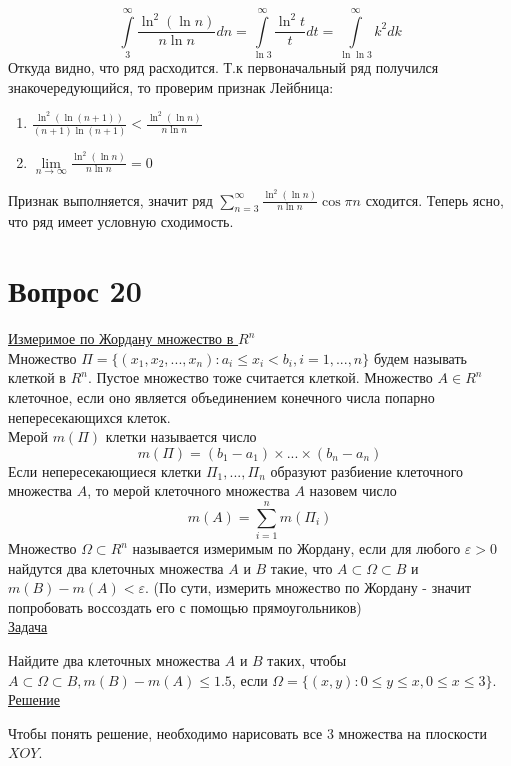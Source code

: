 \documentclass{report}
\begin{document}
$$\int\limits_3^\infty \frac{\ln^2{(\ln{n})}}{n \ln{n}} dn = \int\limits_{\ln{3}}^\infty \frac{\ln^2{t}}{t} dt = \int\limits_{\ln{\ln{3}}}^\infty k^2 dk$$
Откуда видно, что ряд расходится. Т.к первоначальный ряд получился знакочередующийся, то проверим признак Лейбница:
\begin{enumerate}
\item $\frac{\ln^2{(\ln{(n + 1)})}}{(n + 1) \ln{(n + 1)}} < \frac{\ln^2{(\ln{n})}}{n \ln{n}}$
\item $\lim\limits_{n \to \infty} \frac{\ln^2{(\ln{n})}}{n \ln{n}} = 0$
\end{enumerate}
Признак выполняется, значит ряд $\sum\limits_{n = 3}^\infty \frac{\ln^2{(\ln{n})}}{n \ln{n}} \cos{\pi n}$ сходится. Теперь ясно, что ряд имеет условную сходимость.

\newpage
\section{Вопрос 20}
\underline{Измеримое по Жордану множество в $R^{n}$}\\

Множество $\Pi = \{(x_{1}, x_{2}, ... , x_{n}): a_{i} \leq x_{i} < b_{i}, i = 1, ... , n\}$ будем называть клеткой в $R^{n}$. Пустое множество тоже считается клеткой. Множество $A\in R^{n}$ клеточное, если оно является объединением конечного числа попарно непересекающихся клеток. \\
Мерой $m(\Pi)$ клетки называется число
\[m(\Pi) = (b_{1} - a_{1})\times...\times(b_{n} - a_{n})\]
Если непересекающиеся клетки $\Pi_{1}, ..., \Pi_{n}$ образуют разбиение клеточного множества $A$, то мерой клеточного множества $A$ назовем число
\[m(A) = \sum_{i = 1}^{n} m(\Pi_{i})\]
Множество $\Omega\subset R^{n}$ называется измеримым по Жордану, если для любого $\varepsilon > 0$ найдутся два клеточных множества $A$ и $B$ такие, что $A\subset\Omega\subset B$ и $m(B) - m(A) <\varepsilon$. (По сути, измерить множество по Жордану - значит попробовать воссоздать его с помощью прямоугольников)\\

\underline{Задача}

Найдите два клеточных множества $A$ и $B$ таких, чтобы $A\subset\Omega\subset B, m(B) - m(A) \leq 1.5$, если $\Omega = \{(x,y): 0\leq y \leq x, 0 \leq x \leq 3\}$.\\

\underline{Решение}

Чтобы понять решение, необходимо нарисовать все 3 множества на плоскости $XOY$.\\
\end{document}
